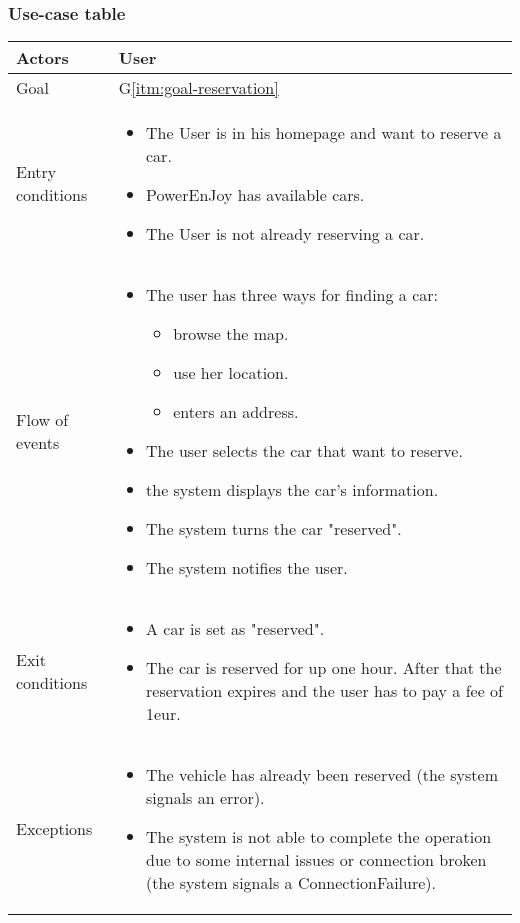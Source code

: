 \newpage
\subsubsection{Use-case table}
\begin{center}
  \begin{tabular}{ l | p{10cm} }
    \hline
    Actors & User\\ \hline
    Goal & G\ref{itm:goal-reservation}\\ \hline
    Entry conditions & 
    \begin{itemize}
			\item The User is in his homepage and want to reserve a car.
			\item PowerEnJoy has available cars.
			\item The User is not already reserving a car.
    \end{itemize}  \\ \hline
    Flow of events &
    \begin{itemize}
      \item The user has three ways for finding a car:
      \begin{itemize}
      			\item browse the map.
      			\item use her location.
      			\item enters an address.
      \end{itemize}
      \item The user selects the car that want to reserve.
      \item the system displays the car's information.%
      \item The system turns the car "reserved".%
      \item The system notifies the user.
    \end{itemize} \\ \hline
    Exit conditions &
    \begin{itemize}
    	\item A car is set as "reserved".
    	\item The car is reserved for up one hour. After that the reservation expires and the user has to pay a fee of 1eur.
    \end{itemize}  \\ \hline
    Exceptions & 
    \begin{itemize}
    \item The vehicle has already been reserved (the system signals an error).
    \item The system is not able to complete the operation due to some internal issues or connection broken (the system signals a ConnectionFailure).
    \end{itemize}  \\ \hline
  \end{tabular}
\end{center}


